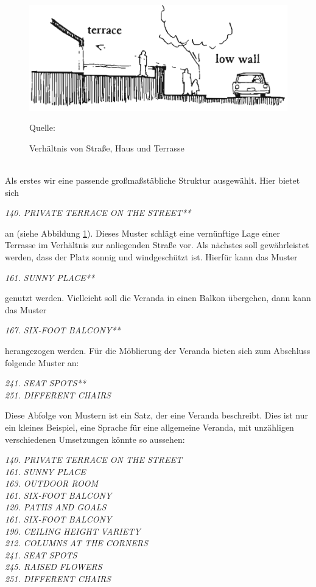 \documentclass[fontsize=11pt,a4paper,final]{scrreprt}[2003/01/01]
\makeatletter
\def\ScaleIfNeeded{%
	\ifdim\Gin@nat@width>\linewidth
		\linewidth
	\else
		\Gin@nat@width
	\fi
}
\newcommand*{\quelle}{%
	\footnotesize Quelle: 
}
\makeatother
\begin{document}
\begin{figure}[H]
	\centering
	\includegraphics[width=\ScaleIfNeeded]{Bilder/Terasse.png}
	\caption{Verhältnis von Straße, Haus und Terrasse}
	\quelle{ \cite[S. 667]{Alexander1977}}
	\label{fig:Terasse}
\end{figure} \ \\
Als erstes wir eine passende großmaßstäbliche Struktur ausgewählt. Hier bietet sich 
\begin{center}
	\textit{140. PRIVATE TERRACE ON THE STREET**}
\end{center} an (siehe Abbildung \ref{fig:Terasse}). Dieses Muster schlägt eine vernünftige Lage einer Terrasse im Verhältnis zur anliegenden Straße vor. Als nächstes soll gewährleistet werden, dass der Platz sonnig und windgeschützt ist. Hierfür kann das Muster
\begin{center}
	\textit{161. SUNNY PLACE**}
\end{center}
genutzt werden. Vielleicht soll die Veranda in einen Balkon übergehen, dann kann das Muster
\begin{center}
	\textit{167. SIX-FOOT BALCONY**}
\end{center}
herangezogen werden. Für die Möblierung der Veranda bieten sich zum Abschluss folgende Muster an:
\begin{center}
	\textit{241. SEAT SPOTS**} \\
	\textit{251. DIFFERENT CHAIRS}	
\end{center}
Diese Abfolge von Mustern ist ein Satz, der eine Veranda beschreibt. Dies ist nur ein kleines Beispiel, eine Sprache für eine allgemeine Veranda, mit unzähligen verschiedenen Umsetzungen könnte so aussehen: 
\begin{center}
\textit{140. PRIVATE TERRACE ON THE STREET} \\
\textit{161. SUNNY PLACE} \\
\textit{163. OUTDOOR ROOM} \\
\textit{161. SIX-FOOT BALCONY} \\
\textit{120. PATHS AND GOALS} \\
\textit{161. SIX-FOOT BALCONY} \\
\textit{190. CEILING HEIGHT VARIETY} \\
\textit{212. COLUMNS AT THE CORNERS} \\
\textit{241. SEAT SPOTS} \\
\textit{245. RAISED FLOWERS} \\
\textit{251. DIFFERENT CHAIRS}
\end{center}
\end{document}
